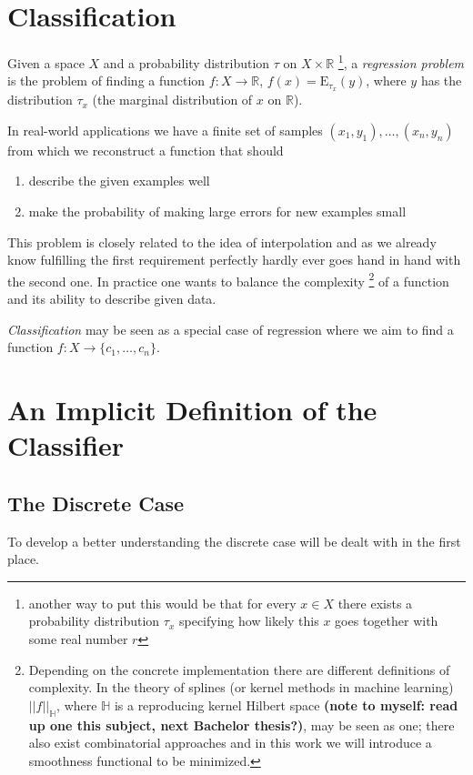 \section{Classification}
Given a space $X$ and a probability distribution $\tau$ on $X\times \mathbb{R}$
\footnote{another way to put this would be that for every $x\in X$ there exists a probability distribution $\tau _x$ specifying how likely this $x$ goes together with some real number $r$},
a \textit{regression problem} is the problem of finding a function $f:X\rightarrow \mathbb{R}$, $f(x)=\mathrm{E}_{\tau _x}(y)$, where  $y$ has the distribution $\tau _x$ (the marginal distribution of $x$ on $\mathbb{R}$).

In real-world applications we have a finite set of samples $(x_1,y_1), \dots, (x_n,y_n)$ from which we reconstruct a function that should
\begin{enumerate}
    \item describe the given examples well
    \item make the probability of making large errors for new examples small
\end{enumerate}
This problem is closely related to the idea of interpolation and as we already know fulfilling the first requirement perfectly hardly ever goes hand in hand with the second one. In practice one wants to balance the complexity \footnote{Depending on the concrete implementation there are different definitions of complexity. In the theory of splines (or kernel methods in machine learning) $||f||_\mathbb{H}$, where $\mathbb{H}$ is a reproducing kernel Hilbert space \textbf{(note to myself: read up one this subject, next Bachelor thesis?)}, may be seen as one; there also exist combinatorial approaches and in this work we will introduce a smoothness functional to be minimized.} of a function and its ability to describe given data.

\textit{Classification} may be seen as a special case of regression where we aim to find a function $f:X\rightarrow \{c_1,\dots,c_n\}$.

\section{An Implicit Definition of the Classifier}
\subsection{The Discrete Case}
To develop a better understanding the discrete case will be dealt with in the first place.

